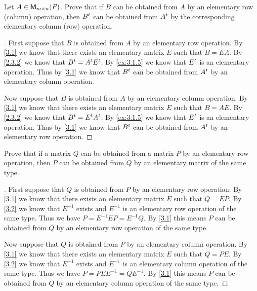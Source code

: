 \begin{ex}\label{ex:3.1.6}
  Let \(A \in \mathsf{M}_{{m} \times n}({\mathit{F}})\).
  Prove that if \(B\) can be obtained from \(A\) by an elementary row (column) operation, then \({B}^{t}\) can be obtained from \({A}^{t}\) by the corresponding elementary column (row) operation.
\end{ex}

\begin{proof}[]
  First suppose that \(B\) is obtained from \(A\) by an elementary row operation.
  By \cref{3.1} we know that there exists an elementary matrix \(E\) such that \(B = EA\).
  By \cref{2.3.2} we know that \({B}^{t} = {A}^{t} {E}^{t}\).
  By \cref{ex:3.1.5} we know that \({E}^{t}\) is an elementary operation.
  Thus by \cref{3.1} we know that \({B}^{t}\) can be obtained from \({A}^{t}\) by an elementary column operation.

  Now suppose that \(B\) is obtained from \(A\) by an elementary column operation.
  By \cref{3.1} we know that there exists an elementary matrix \(E\) such that \(B = AE\).
  By \cref{2.3.2} we know that \({B}^{t} = {E}^{t} {A}^{t}\).
  By \cref{ex:3.1.5} we know that \({E}^{t}\) is an elementary operation.
  Thus by \cref{3.1} we know that \({B}^{t}\) can be obtained from \({A}^{t}\) by an elementary row operation.
\end{proof}

\setcounter{ex}{7}
\begin{ex}\label{ex:3.1.8}
  Prove that if a matrix \(Q\) can be obtained from a matrix \(P\) by an elementary row operation, then \(P\) can be obtained from \(Q\) by an elementary matrix of the same type.
\end{ex}

\begin{proof}[]
  First suppose that \(Q\) is obtained from \(P\) by an elementary row operation.
  By \cref{3.1} we know that there exists an elementary matrix \(E\) such that \(Q = EP\).
  By \cref{3.2} we know that \(E^{-1}\) exists and \(E^{-1}\) is an elementary row operation of the same type.
  Thus we have \(P = E^{-1} E P = E^{-1} Q\).
  By \cref{3.1} this means \(P\) can be obtained from \(Q\) by an elementary row operation of the same type.

  Now suppose that \(Q\) is obtained from \(P\) by an elementary column operation.
  By \cref{3.1} we know that there exists an elementary matrix \(E\) such that \(Q = PE\).
  By \cref{3.2} we know that \(E^{-1}\) exists and \(E^{-1}\) is an elementary column operation of the same type.
  Thus we have \(P = P E E^{-1} = Q E^{-1}\).
  By \cref{3.1} this means \(P\) can be obtained from \(Q\) by an elementary column operation of the same type.
\end{proof}


